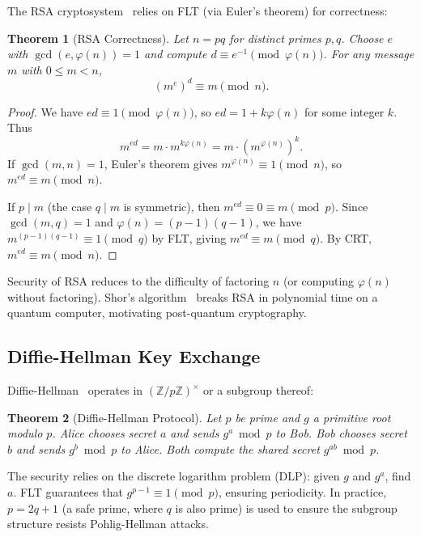 \documentclass{amsart}
\theoremstyle{plain}
\newtheorem{theorem}{Theorem}[section]
\theoremstyle{definition}
\theoremstyle{remark}
\newcommand{\Z}{\mathbb{Z}}
\begin{document}
The RSA cryptosystem~\cite{rsa1978} relies on FLT (via Euler's theorem) for correctness:

\begin{theorem}[RSA Correctness]\label{thm:rsa}
Let $n = pq$ for distinct primes $p, q$. Choose $e$ with $\gcd(e, \varphi(n)) = 1$ and compute $d \equiv e^{-1} \pmod{\varphi(n)}$. For any message $m$ with $0 \le m < n$,
\[
(m^e)^d \equiv m \pmod{n}.
\]
\end{theorem}

\begin{proof}
We have $ed \equiv 1 \pmod{\varphi(n)}$, so $ed = 1 + k\varphi(n)$ for some integer $k$. Thus
\[
m^{ed} = m \cdot m^{k\varphi(n)} = m \cdot (m^{\varphi(n)})^k.
\]
If $\gcd(m, n) = 1$, Euler's theorem gives $m^{\varphi(n)} \equiv 1 \pmod{n}$, so $m^{ed} \equiv m \pmod{n}$.

If $p \mid m$ (the case $q \mid m$ is symmetric), then $m^{ed} \equiv 0 \equiv m \pmod{p}$. Since $\gcd(m, q) = 1$ and $\varphi(n) = (p-1)(q-1)$, we have $m^{(p-1)(q-1)} \equiv 1 \pmod{q}$ by FLT, giving $m^{ed} \equiv m \pmod{q}$. By CRT, $m^{ed} \equiv m \pmod{n}$.
\end{proof}

Security of RSA reduces to the difficulty of factoring $n$ (or computing $\varphi(n)$ without factoring). Shor's algorithm~\cite{shor1994} breaks RSA in polynomial time on a quantum computer, motivating post-quantum cryptography.

\subsection{Diffie-Hellman Key Exchange}

Diffie-Hellman~\cite{diffiehellman1976} operates in $(\Z/p\Z)^\times$ or a subgroup thereof:

\begin{theorem}[Diffie-Hellman Protocol]\label{thm:dh}
Let $p$ be prime and $g$ a primitive root modulo $p$. Alice chooses secret $a$ and sends $g^a \bmod p$ to Bob. Bob chooses secret $b$ and sends $g^b \bmod p$ to Alice. Both compute the shared secret $g^{ab} \bmod p$.
\end{theorem}

The security relies on the discrete logarithm problem (DLP): given $g$ and $g^a$, find $a$. FLT guarantees that $g^{p-1} \equiv 1 \pmod{p}$, ensuring periodicity. In practice, $p = 2q + 1$ (a safe prime, where $q$ is also prime) is used to ensure the subgroup structure resists Pohlig-Hellman attacks.
\end{document}

